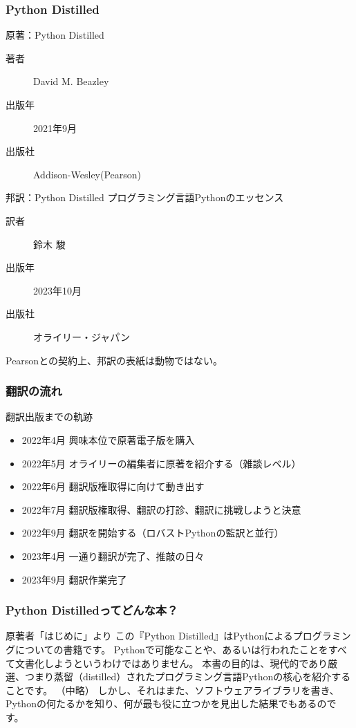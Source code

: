 \documentclass[aspectratio=169,dvipdfmx,12pt,notheorems]{beamer}
\theoremstyle{definition}
\begin{document}
\begin{frame}\frametitle{Python Distilled}

\begin{block}{原著：Python Distilled}
\begin{description}
\item[著者] David M. Beazley
\item[出版年] 2021年9月
\item[出版社] Addison-Wesley(Pearson)
\end{description}
\end{block}

\begin{block}{邦訳：Python Distilled プログラミング言語Pythonのエッセンス}
\begin{description}
\item[訳者] 鈴木 駿
\item[出版年] 2023年10月
\item[出版社] オライリー・ジャパン
\end{description}
\end{block}

Pearsonとの契約上、邦訳の表紙は動物ではない。

\end{frame}

\begin{frame}\frametitle{翻訳の流れ}

\begin{block}{翻訳出版までの軌跡}
\begin{itemize}
\item 2022年4月 興味本位で原著電子版を購入
\item 2022年5月 オライリーの編集者に原著を紹介する（雑談レベル）
\item 2022年6月 翻訳版権取得に向けて動き出す
\item 2022年7月 翻訳版権取得、翻訳の打診、翻訳に挑戦しようと決意
\item 2022年9月 翻訳を開始する（ロバストPythonの監訳と並行）
\item 2023年4月 一通り翻訳が完了、推敲の日々
\item 2023年9月 翻訳作業完了
\end{itemize}
\end{block}

\end{frame}

\begin{frame}\frametitle{Python Distilledってどんな本？}

\begin{block}{原著者「はじめに」より}
この『Python Distilled』はPythonによるプログラミングについての書籍です。
Pythonで可能なことや、あるいは行われたことをすべて文書化しようというわけではありません。
本書の目的は、現代的であり厳選、つまり蒸留（distilled）されたプログラミング言語Pythonの核心を紹介することです。
（中略）
しかし、それはまた、ソフトウェアライブラリを書き、Pythonの何たるかを知り、何が最も役に立つかを見出した結果でもあるのです。
\end{block}

\end{frame}
\end{document}
